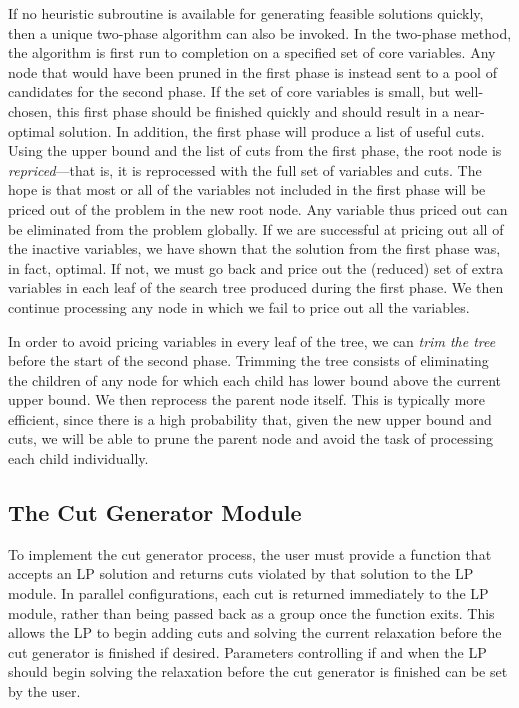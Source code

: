 If no heuristic subroutine is available for generating feasible
solutions quickly, then a unique two-phase algorithm can also be
invoked. In the two-phase method, the algorithm is first run to
completion on a specified set of core variables. Any node that would
have been pruned in the first phase is instead sent to a pool of
candidates for the second phase. If the set of core variables is
small, but well-chosen, this first phase should be finished quickly
and should result in a near-optimal solution. In addition, the first
phase will produce a list of useful cuts. Using the upper bound and
the list of cuts from the first phase, the root node is {\em
repriced}---that is, it is reprocessed with the full set of variables
and cuts. The hope is that most or all of the variables not included
in the first phase will be priced out of the problem in the new root
node. Any variable thus priced out can be eliminated from the problem
globally. If we are successful at pricing out all of the inactive
variables, we have shown that the solution from the first phase was,
in fact, optimal. If not, we must go back and price out the (reduced)
set of extra variables in each leaf of the search tree produced during
the first phase. We then continue processing any node in which we fail
to price out all the variables.

In order to avoid pricing variables in every leaf of the tree, we can
{\em trim the tree} before the start of the second phase. Trimming the
tree consists of eliminating the children of any node for which
each child has lower bound above the current upper
bound. We then reprocess the parent node itself. This is typically
more efficient, since there is a high probability that, given the new
upper bound and cuts, we will be able to prune the parent node and
avoid the task of processing each child individually.

\subsection{The Cut Generator Module}

To implement the cut generator process, the user must provide a
function that accepts an LP solution and returns cuts violated by that
solution to the LP module. In parallel configurations, each cut is
returned immediately to the LP module, rather than being passed back
as a group once the function exits. This allows the LP to begin adding
cuts and solving the current relaxation before the cut generator is
finished if desired. Parameters controlling if and when the LP should
begin solving the relaxation before the cut generator is finished can
be set by the user.

